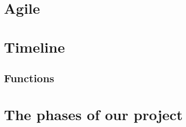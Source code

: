 
\section{Agile}


\section{Timeline}\label{sec:options}
\subsection*{Functions}



\section{The phases of our project}\label{sec:custom}
